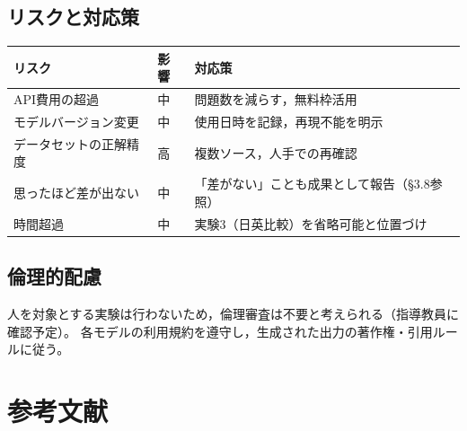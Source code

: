 \documentclass[11pt,a4paper,oneside]{article}
\begin{document}
\subsection{リスクと対応策}

\begin{center}
\begin{tabular}{p{}p{}p{}}
\toprule
リスク & 影響 & 対応策 \\
\midrule
API費用の超過 & 中 & 問題数を減らす，無料枠活用 \\
モデルバージョン変更 & 中 & 使用日時を記録，再現不能を明示 \\
データセットの正解精度 & 高 & 複数ソース，人手での再確認 \\
思ったほど差が出ない & 中 & 「差がない」ことも成果として報告（\S3.8参照） \\
時間超過 & 中 & 実験3（日英比較）を省略可能と位置づけ \\
\bottomrule
\end{tabular}
\end{center}

\subsection{倫理的配慮}

人を対象とする実験は行わないため，倫理審査は不要と考えられる（指導教員に確認予定）。
各モデルの利用規約を遵守し，生成された出力の著作権・引用ルールに従う。

\section{参考文献}
\end{document}
